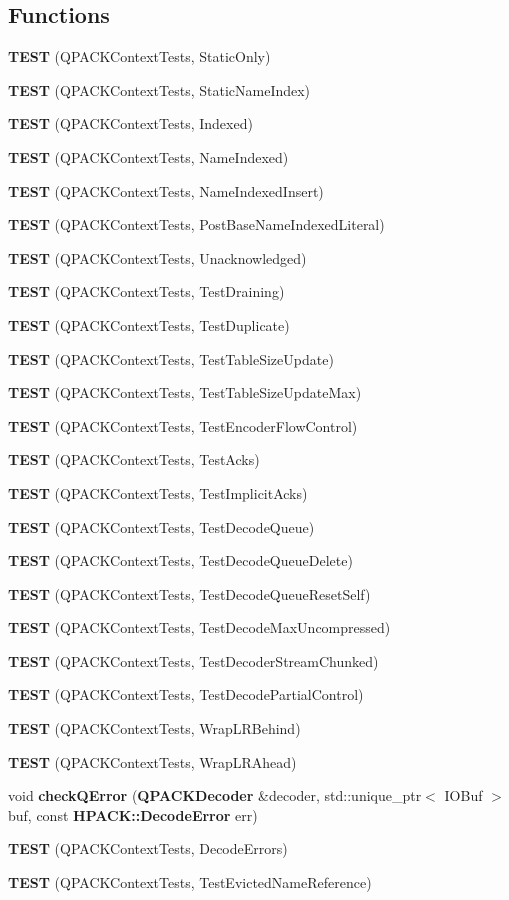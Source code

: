 \subsection*{Functions}
\begin{DoxyCompactItemize}
\item 
{\bf T\+E\+ST} (Q\+P\+A\+C\+K\+Context\+Tests, Static\+Only)
\item 
{\bf T\+E\+ST} (Q\+P\+A\+C\+K\+Context\+Tests, Static\+Name\+Index)
\item 
{\bf T\+E\+ST} (Q\+P\+A\+C\+K\+Context\+Tests, Indexed)
\item 
{\bf T\+E\+ST} (Q\+P\+A\+C\+K\+Context\+Tests, Name\+Indexed)
\item 
{\bf T\+E\+ST} (Q\+P\+A\+C\+K\+Context\+Tests, Name\+Indexed\+Insert)
\item 
{\bf T\+E\+ST} (Q\+P\+A\+C\+K\+Context\+Tests, Post\+Base\+Name\+Indexed\+Literal)
\item 
{\bf T\+E\+ST} (Q\+P\+A\+C\+K\+Context\+Tests, Unacknowledged)
\item 
{\bf T\+E\+ST} (Q\+P\+A\+C\+K\+Context\+Tests, Test\+Draining)
\item 
{\bf T\+E\+ST} (Q\+P\+A\+C\+K\+Context\+Tests, Test\+Duplicate)
\item 
{\bf T\+E\+ST} (Q\+P\+A\+C\+K\+Context\+Tests, Test\+Table\+Size\+Update)
\item 
{\bf T\+E\+ST} (Q\+P\+A\+C\+K\+Context\+Tests, Test\+Table\+Size\+Update\+Max)
\item 
{\bf T\+E\+ST} (Q\+P\+A\+C\+K\+Context\+Tests, Test\+Encoder\+Flow\+Control)
\item 
{\bf T\+E\+ST} (Q\+P\+A\+C\+K\+Context\+Tests, Test\+Acks)
\item 
{\bf T\+E\+ST} (Q\+P\+A\+C\+K\+Context\+Tests, Test\+Implicit\+Acks)
\item 
{\bf T\+E\+ST} (Q\+P\+A\+C\+K\+Context\+Tests, Test\+Decode\+Queue)
\item 
{\bf T\+E\+ST} (Q\+P\+A\+C\+K\+Context\+Tests, Test\+Decode\+Queue\+Delete)
\item 
{\bf T\+E\+ST} (Q\+P\+A\+C\+K\+Context\+Tests, Test\+Decode\+Queue\+Reset\+Self)
\item 
{\bf T\+E\+ST} (Q\+P\+A\+C\+K\+Context\+Tests, Test\+Decode\+Max\+Uncompressed)
\item 
{\bf T\+E\+ST} (Q\+P\+A\+C\+K\+Context\+Tests, Test\+Decoder\+Stream\+Chunked)
\item 
{\bf T\+E\+ST} (Q\+P\+A\+C\+K\+Context\+Tests, Test\+Decode\+Partial\+Control)
\item 
{\bf T\+E\+ST} (Q\+P\+A\+C\+K\+Context\+Tests, Wrap\+L\+R\+Behind)
\item 
{\bf T\+E\+ST} (Q\+P\+A\+C\+K\+Context\+Tests, Wrap\+L\+R\+Ahead)
\item 
void {\bf check\+Q\+Error} ({\bf Q\+P\+A\+C\+K\+Decoder} \&decoder, std\+::unique\+\_\+ptr$<$ I\+O\+Buf $>$ buf, const {\bf H\+P\+A\+C\+K\+::\+Decode\+Error} err)
\item 
{\bf T\+E\+ST} (Q\+P\+A\+C\+K\+Context\+Tests, Decode\+Errors)
\item 
{\bf T\+E\+ST} (Q\+P\+A\+C\+K\+Context\+Tests, Test\+Evicted\+Name\+Reference)
\end{DoxyCompactItemize}


